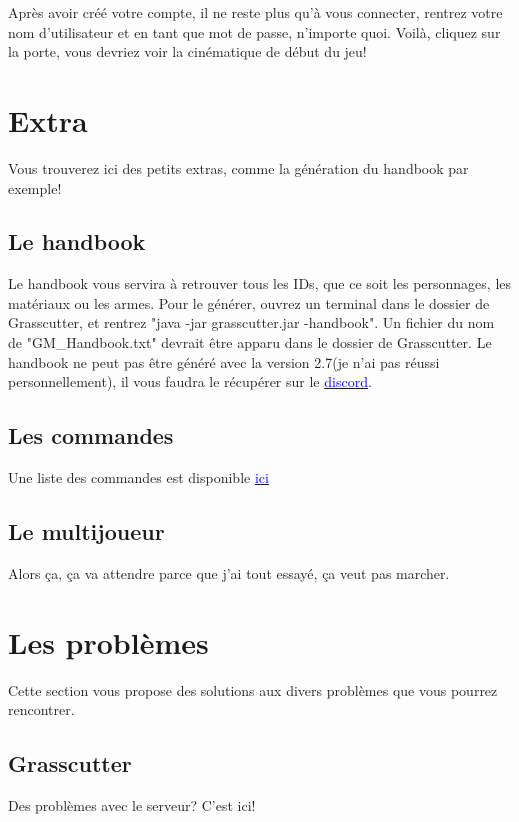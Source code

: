 \documentclass{article}
\begin{document}
Après avoir créé votre compte, il ne reste plus qu'à vous connecter, rentrez votre nom d'utilisateur et en tant que mot de passe, n'importe quoi.\newline
Voilà, cliquez sur la porte, vous devriez voir la cinématique de début du jeu!

\hrulefill

\section{Extra}
Vous trouverez ici des petits extras, comme la génération du handbook par exemple!

\subsection{Le handbook}
Le handbook vous servira à retrouver tous les IDs, que ce soit les personnages, les matériaux ou les armes.\newline
Pour le générer, ouvrez un terminal dans le dossier de Grasscutter, et rentrez "java -jar grasscutter.jar -handbook". Un fichier du nom de "GM\_Handbook.txt" devrait être apparu dans le dossier de Grasscutter.\newline
Le handbook ne peut pas être généré avec la version 2.7(je n'ai pas réussi personnellement), il vous faudra le récupérer sur le \href{https://discord.gg/ZwKEJn7sxT}{\textcolor{blue}{discord}}.

\subsection{Les commandes}
Une liste des commandes est disponible \href{https://github.com/Grasscutters/Grasscutter/wiki/Commands}{\textcolor{blue}{ici}}

\subsection{Le multijoueur}
Alors ça, ça va attendre parce que j'ai tout essayé, ça veut pas marcher.

\hrulefill

\section{Les problèmes}
Cette section vous propose des solutions aux divers problèmes que vous pourrez rencontrer.

\subsection{Grasscutter}
Des problèmes avec le serveur? C'est ici!
\end{document}
